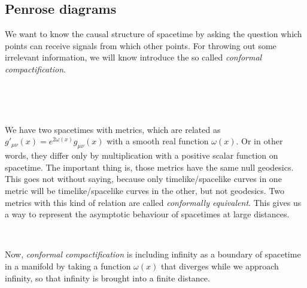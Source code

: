 \subsection{Penrose diagrams}
	We want to know the causal structure of spacetime by asking the question which points can receive signals from which other points. 
For throwing out some irrelevant information, we will know introduce the so called \textit{conformal compactification}.
\parbox{\linewidth}{~}
\hfill
\parbox{0.02\linewidth}{~}
\begin{minipage}[][][c]{0.96\textwidth}
We have two spacetimes with metrics, which are related as $g'_{\mu\nu}(x)=e^{2\omega(x)}g_{\mu\nu}(x)$ with a smooth real function $\omega(x)$. Or in other words, they differ only by multiplication with a positive scalar function on spacetime. The important thing is, those metrics have the same null geodesics.
This goes not without saying, because only timelike/spacelike curves in one metric will be timelike/spacelike curves in the other, but not geodesics.
Two metrics with this kind of relation are called \textit{conformally equivalent}. 
This gives us a way to represent the asymptotic behaviour of spacetimes at large distances.
\end{minipage}
\hfill

\parbox{\linewidth}{~}%

Now, \textit{conformal compactification} is including infinity as a boundary of spacetime in a manifold by taking a function $\omega(x)$ that diverges while we approach infinity, so that infinity is brought into a finite distance.

